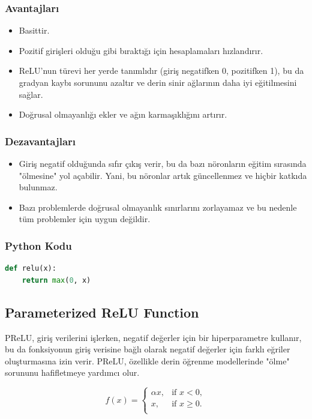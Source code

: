 \subsubsection{Avantajları}
\begin{itemize}
    \item Basittir.
    \item Pozitif girişleri olduğu gibi bıraktığı için hesaplamaları hızlandırır.
    \item ReLU'nun türevi her yerde tanımlıdır (giriş negatifken 0, pozitifken 1), bu da gradyan kaybı sorununu azaltır ve derin sinir ağlarının daha iyi eğitilmesini sağlar.
    \item Doğrusal olmayanlığı ekler ve ağın karmaşıklığını artırır.
\end{itemize}

\subsubsection{Dezavantajları}
\begin{itemize}
    \item Giriş negatif olduğunda sıfır çıkış verir, bu da bazı nöronların eğitim sırasında "ölmesine" yol açabilir. Yani, bu nöronlar artık güncellenmez ve hiçbir katkıda bulunmaz.
    \item Bazı problemlerde doğrusal olmayanlık sınırlarını zorlayamaz ve bu nedenle tüm problemler için uygun değildir.
\end{itemize}

\subsubsection{Python Kodu}

\begin{lstlisting}[language=Python]
def relu(x):
    return max(0, x)
\end{lstlisting}

\newpage

\subsection{Parameterized ReLU Function}
PReLU, giriş verilerini işlerken, negatif değerler için bir hiperparametre kullanır, bu da fonksiyonun giriş verisine bağlı olarak negatif değerler için farklı eğriler oluşturmasına izin verir. PReLU, özellikle derin öğrenme modellerinde "ölme" sorununu hafifletmeye yardımcı olur.

\[f(x) = \begin{cases} 
\alpha x, & \text{if } x < 0, \\
x, & \text{if } x \geq 0. \\
\end{cases}
\]

